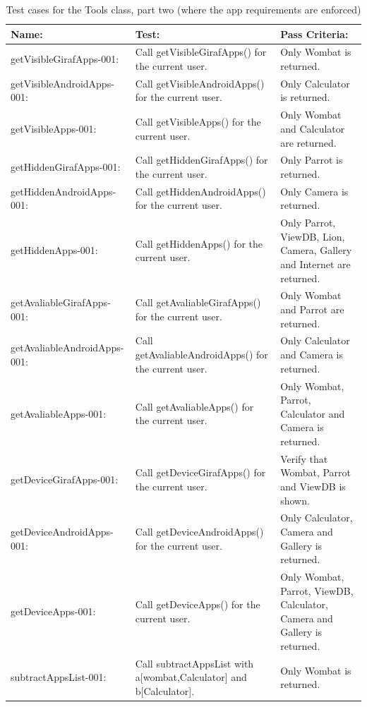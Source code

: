 \begin{table}[ht]
\caption{Test cases for the Tools class, part two (where the app requirements are enforced)} %
\centering  %
\begin{tabular}{| p{1.7in} | p{1.7in} | p{1.7in} |}
\hline
Name: & Test: & Pass Criteria: \\ [0.5ex] %
\hline    
getVisibleGirafApps-001: & Call getVisibleGirafApps() for the current user. & Only Wombat is returned. \\ \hline 
getVisibleAndroidApps-001: & Call getVisibleAndroidApps() for the current user. & Only Calculator is returned. \\ \hline
getVisibleApps-001: & Call getVisibleApps() for the current user. & Only Wombat and Calculator are returned. \\ \hline 
getHiddenGirafApps-001: & Call getHiddenGirafApps() for the current user. & Only Parrot is returned. \\ \hline 
getHiddenAndroidApps-001: & Call getHiddenAndroidApps() for the current user. & Only Camera is returned. \\ \hline 
getHiddenApps-001: & Call getHiddenApps() for the current user. & Only Parrot, ViewDB, Lion, Camera, Gallery and Internet are returned. \\ \hline 
getAvaliableGirafApps-001: & Call getAvaliableGirafApps() for the current user. & Only Wombat and Parrot are returned. \\ \hline 
getAvaliableAndroidApps-001: & Call getAvaliableAndroidApps() for the current user. & Only Calculator and Camera is returned. \\ \hline 
getAvaliableApps-001: & Call getAvaliableApps() for the current user. & Only Wombat, Parrot, Calculator and Camera is returned. \\ \hline 
getDeviceGirafApps-001: & Call getDeviceGirafApps() for the current user. & Verify that Wombat, Parrot and ViewDB is shown. \\ \hline 
getDeviceAndroidApps-001: & Call getDeviceAndroidApps() for the current user. & Only Calculator, Camera and Gallery is returned. \\ \hline 
getDeviceApps-001: & Call getDeviceApps() for the current user. & Only Wombat, Parrot, ViewDB, Calculator, Camera and Gallery is returned. \\ \hline 
subtractAppsList-001: & Call subtractAppsList with a[wombat,Calculator] and b[Calculator]. & Only Wombat is returned. \\ [1ex] 
\hline %
\end{tabular}
\label{table:tools_tests2} %
\end{table}

